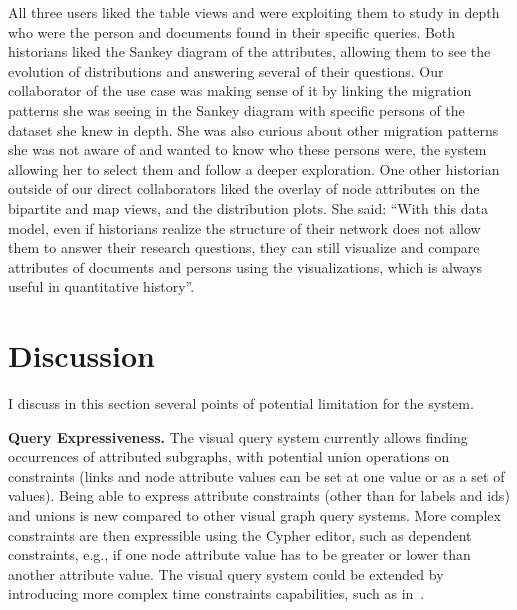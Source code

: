 All three users liked the table views and were exploiting them to study in depth who were the person and documents found in their specific queries.
Both historians liked the Sankey diagram of the attributes, allowing them to see the evolution of distributions and answering several of their questions.
Our collaborator of the use case \nicole was making sense of it by linking the migration patterns she was seeing in the Sankey diagram with specific persons of the dataset she knew in depth.
She was also curious about other migration patterns she was not aware of and wanted to know who these persons were, the system allowing her to select them and follow a deeper exploration.
One other historian outside of our direct collaborators liked the overlay of node attributes on the bipartite and map views, and the distribution plots. She said: ``With this data model, even if historians realize the structure of their network does not allow them to answer their research questions, they can still visualize and compare attributes of documents and persons using the visualizations, which is always useful in quantitative history''.


\section{Discussion}

I discuss in this section several points of potential limitation for the system.

\noindent\textbf{Query Expressiveness.}
The visual query system currently allows finding occurrences of attributed subgraphs, with potential union operations on constraints (links and node attribute values can be set at one value or as a set of values). Being able to express attribute constraints (other than for labels and ids) and unions is new compared to other visual graph query systems.
More complex constraints are then expressible using the Cypher editor, such as dependent constraints, e.g., if one node attribute value has to be greater or lower than another attribute value.
The visual query system could be extended by introducing more complex time constraints capabilities, such as in~\cite{monroe2012exploring}.

